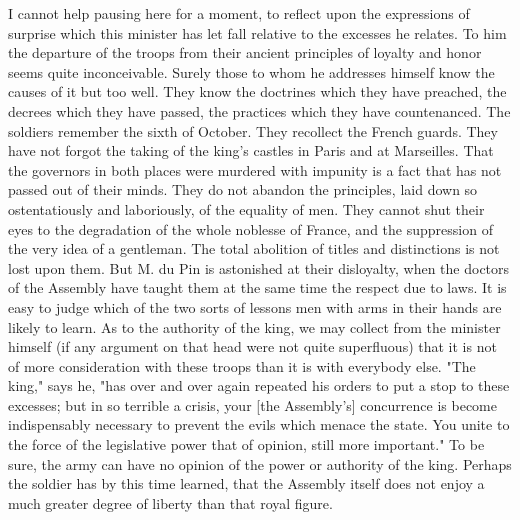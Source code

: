 I cannot help pausing here for a moment, to reflect upon the expressions of surprise which this minister has let fall relative to the excesses he relates. To him the departure of the troops from their ancient principles of loyalty and honor seems quite inconceivable. Surely those to whom he addresses himself know the causes of it but too well. They know the doctrines which they have preached, the decrees which they have passed, the practices which they have countenanced. The soldiers remember the sixth of October. They recollect the French guards. They have not forgot the taking of the king's castles in Paris and at Marseilles. That the governors in both places were murdered with impunity is a fact that has not passed out of their minds. They do not abandon the principles, laid down so ostentatiously and laboriously, of the equality of men. They cannot shut their eyes to the degradation of the whole noblesse of France, and the suppression of the very idea of a gentleman. The total abolition of titles and distinctions is not lost upon them. But M. du Pin is astonished at their disloyalty, when the doctors of the Assembly have taught them at the same time the respect due to laws. It is easy to judge which of the two sorts of lessons men with arms in their hands are likely to learn. As to the authority of the king, we may collect from the minister himself (if any argument on that head were not quite superfluous) that it is not of more consideration with these troops than it is with everybody else. "The king," says he, "has over and over again repeated his orders to put a stop to these excesses; but in so terrible a crisis, your [the Assembly's] concurrence is become indispensably necessary to prevent the evils which menace the state. You unite to the force of the legislative power that of opinion, still more important." To be sure, the army can have no opinion of the power or authority of the king. Perhaps the soldier has by this time learned, that the Assembly itself does not enjoy a much greater degree of liberty than that royal figure.

